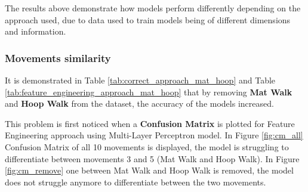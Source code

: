             The results above demonstrate how models perform differently depending on the approach used, due to data used to train models being of different dimensions and information. 

        \subsubsection{Movements similarity}   
        
            It is demonstrated in Table \ref{tab:correct_approach_mat_hoop} and Table \ref{tab:feature_engineering_approach_mat_hoop} that by removing \textbf{Mat Walk} and \textbf{Hoop Walk} from the dataset, the accuracy of the models increased.

            This problem is first noticed when a \textbf{Confusion Matrix} is plotted for Feature Engineering approach using Multi-Layer Perceptron model. In Figure \ref{fig:cm_all} Confusion Matrix of all 10 movements is displayed, the model is struggling to differentiate between movements 3 and 5 (Mat Walk and Hoop Walk). In Figure \ref{fig:cm_remove} one between Mat Walk and Hoop Walk is removed, the model does not struggle anymore to differentiate between the two movements.
            
